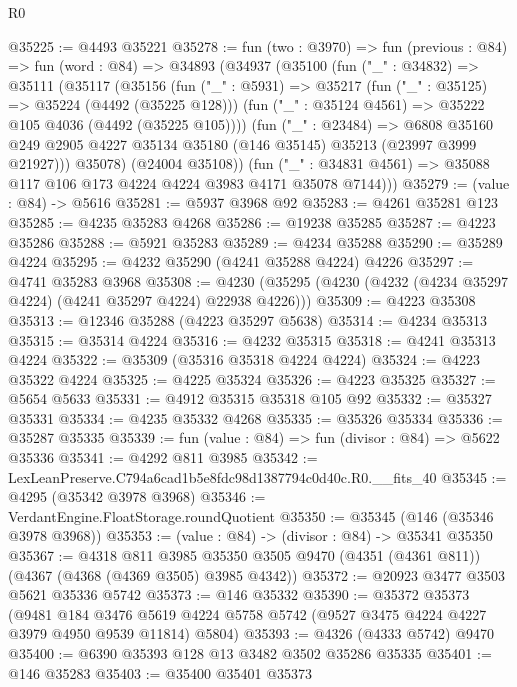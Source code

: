 \begin{lexlean}{R0}
\begin{coremodule}
@35225 := @4493 @35221
@35278 := fun (two : @3970) =>
  fun (previous : @84) =>
  fun (word : @84) =>
  @34893
    (@34937
      (@35100
        (fun ("_" : @34832) =>
        @35111
          (@35117
            (@35156
              (fun ("_" : @5931) =>
              @35217
                (fun ("_" : @35125) => @35224 (@4492 (@35225 @128)))
                (fun ("_" : @35124 @4561) => @35222 @105 @4036 (@4492 (@35225 @105))))
              (fun ("_" : @23484) =>
              @6808
                @35160
                @249
                @2905
                @4227
                @35134
                @35180
                (@146 @35145)
                @35213
                (@23997 @3999 @21927)))
            @35078)
          (@24004 @35108))
        (fun ("_" : @34831 @4561) => @35088 @117 @106 @173 @4224 @4224 @3983 @4171 @35078 @7144)))
@35279 := (value : @84) -> @5616
@35281 := @5937 @3968 @92
@35283 := @4261 @35281 @123
@35285 := @4235 @35283 @4268
@35286 := @19238 @35285
@35287 := @4223 @35286
@35288 := @5921 @35283
@35289 := @4234 @35288
@35290 := @35289 @4224
@35295 := @4232 @35290 (@4241 @35288 @4224) @4226
@35297 := @4741 @35283 @3968
@35308 := @4230 (@35295 (@4230 (@4232 (@4234 @35297 @4224) (@4241 @35297 @4224) @22938 @4226)))
@35309 := @4223 @35308
@35313 := @12346 @35288 (@4223 @35297 @5638)
@35314 := @4234 @35313
@35315 := @35314 @4224
@35316 := @4232 @35315
@35318 := @4241 @35313 @4224
@35322 := @35309 (@35316 @35318 @4224 @4224)
@35324 := @4223 @35322 @4224
@35325 := @4225 @35324
@35326 := @4223 @35325
@35327 := @5654 @5633
@35331 := @4912 @35315 @35318 @105 @92
@35332 := @35327 @35331
@35334 := @4235 @35332 @4268
@35335 := @35326 @35334
@35336 := @35287 @35335
@35339 := fun (value : @84) => fun (divisor : @84) => @5622 @35336
@35341 := @4292 @811 @3985
@35342 := LexLeanPreserve.C794a6cad1b5e8fdc98d1387794c0d40c.R0.__fits_40
@35345 := @4295 (@35342 @3978 @3968)
@35346 := VerdantEngine.FloatStorage.roundQuotient
@35350 := @35345 (@146 (@35346 @3978 @3968))
@35353 := (value : @84) -> (divisor : @84) -> @35341 @35350
@35367 := @4318
    @811
    @3985
    @35350
    @3505
    @9470
    (@4351 (@4361 @811))
    (@4367 (@4368 (@4369 @3505) @3985 @4342))
@35372 := @20923 @3477 @3503 @5621 @35336 @5742
@35373 := @146 @35332
@35390 := @35372
    @35373
    (@9481
      @184
      @3476
      @5619
      @4224
      @5758
      @5742
      (@9527 @3475 @4224 @4227 @3979 @4950 @9539 @11814)
      @5804)
@35393 := @4326 (@4333 @5742) @9470
@35400 := @6390 @35393 @128 @13 @3482 @3502 @35286 @35335
@35401 := @146 @35283
@35403 := @35400 @35401 @35373

\end{coremodule}
\end{lexlean}
